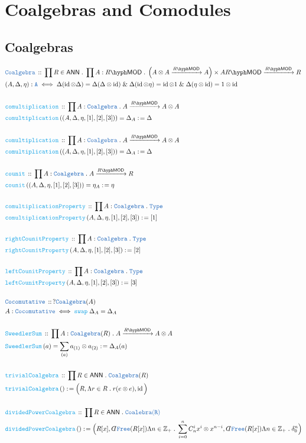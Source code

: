 \documentclass[12pt]{scrartcl}%
\newcommand{\TYPE}[1]{\textcolor{NavyBlue}{\mathtt{#1}}}%
\newcommand{\FUNC}[1]{\textcolor{Cerulean}{\mathtt{#1}}}%
\renewcommand{\.}{\; . \;} %
\newcommand{\de}{: \kern 0.1pc =} %
\newcommand{\Act}[1]{\left( #1 \right)} %
\newcommand{\DeclareType}[2]{& \TYPE{#1} \, :: \, #2 \\}%
\newcommand{\DefineType}[3]{& #1 : \TYPE{#2} \iff #3 \\}%
\newcommand{\DeclareFunc}[2]{& \FUNC{#1} \, :: \, #2 \\}%
\newcommand{\DefineFunc}[3]{&  \FUNC{#1}\Act{#2} \de #3 \\}%
\newcommand{\DefineNamedFunc}[4]{&  \FUNC{#1}\Act{#2} = #3 \de #4 \\}%
\newcommand{\Page}[1]{ \begin{align*} #1 \end{align*}  }%
\newcommand{ \bd }{ \ByDef }%
\renewcommand{\And}{\; \& \;}%
\newcommand{\Type}{\TYPE{Type}}%
\newcommand{\Int}{\mathbb{Z}}%
\DeclareMathOperator*{\id}{id}%
\newcommand{\ByDef}{\rotatebox[origin=c]{-180}{$D$}}%
\newcommand{\Arrow}[1]{\xrightarrow{#1}}%
\newcommand{\LMOD}[1]{#1\hyph\mathsf{MOD}} %
\newcommand{\ANN}{\mathsf{ANN}} %
\begin{document}
\section{Coalgebras and Comodules}
\subsection{Coalgebras}
\Page{
	\DeclareType{Coalgebra}{ \prod R \in \ANN \. \prod A :\LMOD{R} \. \left(A \otimes A \Arrow{\LMOD{R}} A\right) \times A \LMOD{R} \Arrow{\LMOD{R}} R }
	\DefineType{(A,\Delta,\eta)}{A}{  \Delta(\id \otimes \Delta) = \Delta (\Delta \otimes \id) 
		\And \Delta (\id \otimes \eta) =  \id \otimes 1 \And   \Delta (\eta \otimes \id) = 1 \otimes \id  }
	\\
	\DeclareFunc{comultiplication}{\prod A : \TYPE{Coalgebra} \. A \Arrow{\LMOD{R}} A \otimes A }
	\DefineNamedFunc{comultiplication}{(A,\Delta,\eta,[1],[2],[3]) }{\Delta_A}{ \Delta  }  
	\\
	\DeclareFunc{comultiplication}{\prod A : \TYPE{Coalgebra} \. A \Arrow{\LMOD{R}} A \otimes A }
	\DefineNamedFunc{comultiplication}{(A,\Delta,\eta,[1],[2],[3]) }{\Delta_A}{ \Delta  }  
	\\
	\DeclareFunc{counit}{\prod A : \TYPE{Coalgebra} \. A \Arrow{\LMOD{R}} R }
	\DefineNamedFunc{counit}{(A,\Delta,\eta,[1],[2],[3]) }{\eta_A}{ \eta  }  
	\\
	\DeclareFunc{comultiplicationProperty}{\prod A : \TYPE{Coalgebra} \. \Type }
	\DefineFunc{comultiplicationProperty }{A,\Delta,\eta,[1],[2],[3] }{ [1]  }  
	\\
	\DeclareFunc{rightCounitProperty}{\prod A : \TYPE{Coalgebra} \. \Type }
	\DefineFunc{rightCounitProperty }{A,\Delta,\eta,[1],[2],[3] }{ [2]  }  
	\\
	\DeclareFunc{leftCounitProperty}{\prod A : \TYPE{Coalgebra} \. \Type }
	\DefineFunc{leftCounitProperty }{A,\Delta,\eta,[1],[2],[3] }{ [3]  } 
	\\
	\DeclareType{Cocomutative}{?\TYPE{Coalgebra}(A)}
	\DefineType{A}{Cocomutative}{\FUNC{swap}\;\Delta_A = \Delta_A}
	\\
	\DeclareFunc{SweedlerSum}{\prod A : \TYPE{Coalgebra}(R) \. A \Arrow{\LMOD{R}} A \otimes A }
	\DefineNamedFunc{SweedlerSum}{a}{\sum_{(a)} a_{(1)} \otimes a_{(2)} }{\Delta_A(a)}
	\\
	\DeclareFunc{trivialCoalgebra}{\prod R \in \ANN \. \TYPE{Coalgebra}(R)}
	\DefineFunc{trivialCoalgebra}{}{  \Big(R, \Lambda r \in R \. r ( e \otimes e ), \id\Big)  }
	\\
	\DeclareFunc{dividedPowerCoalgebra}
	{
		\prod R \in \ANN \. \TYPE{Coalebra(R)} 
	}
	\DefineFunc{dividedPowerCoalgebra}{}{ \Big( R[x], \bd \TYPE{Free}(R[x])\Lambda n \in \Int_+ \. \sum^n_{i=0} C^i_n x^{i} \otimes x^{n-i} , \bd \TYPE{Free}(R[x])\Lambda n \in \Int_+ \. \delta^n_0  \Big)  }
}
\end{document}
